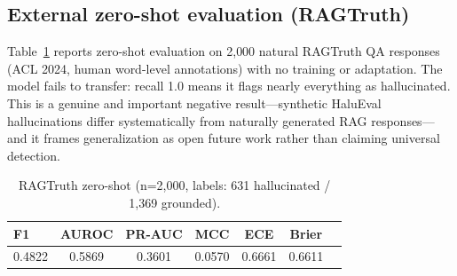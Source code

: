 \subsection{External zero-shot evaluation (RAGTruth)}

Table~\ref{tab:ragtruth} reports zero-shot evaluation on 2{,}000 natural RAGTruth \cite{ragtruth} QA responses (ACL 2024, human word-level annotations) with no training or adaptation. The model fails to transfer: recall 1.0 means it flags nearly everything as hallucinated. This is a genuine and important negative result---synthetic HaluEval hallucinations differ systematically from naturally generated RAG responses---and it frames generalization as open future work rather than claiming universal detection.

\begin{table}[t]
\centering
\small
\caption{RAGTruth zero-shot (n=2{,}000, labels: 631 hallucinated / 1{,}369 grounded).}
\label{tab:ragtruth}
\begin{tabular}{@{}lcccccc@{}}
\toprule
\textbf{F1} & \textbf{AUROC} & \textbf{PR-AUC} & \textbf{MCC} & \textbf{ECE} & \textbf{Brier} \\
\midrule
0.4822 & 0.5869 & 0.3601 & 0.0570 & 0.6661 & 0.6611 \\
\bottomrule
\end{tabular}
\end{table}
